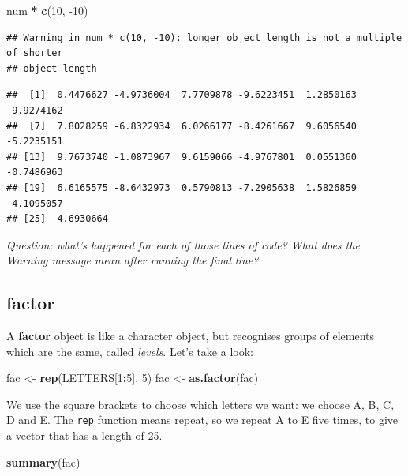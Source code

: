 \documentclass[
]{book}
\newenvironment{Shaded}{\begin{snugshade}}{\end{snugshade}}
\newcommand{\DecValTok}[1]{\textcolor[rgb]{0.00,0.00,0.81}{#1}}
\newcommand{\KeywordTok}[1]{\textcolor[rgb]{0.13,0.29,0.53}{\textbf{#1}}}
\newcommand{\NormalTok}[1]{#1}
\newcommand{\OperatorTok}[1]{\textcolor[rgb]{0.81,0.36,0.00}{\textbf{#1}}}
\newcommand{\StringTok}[1]{\textcolor[rgb]{0.31,0.60,0.02}{#1}}
\begin{document}
\begin{Shaded}
\begin{Highlighting}[]
\NormalTok{num }\OperatorTok{*}\StringTok{ }\KeywordTok{c}\NormalTok{(}\DecValTok{10}\NormalTok{, }\DecValTok{-10}\NormalTok{)}
\end{Highlighting}
\end{Shaded}

\begin{verbatim}
## Warning in num * c(10, -10): longer object length is not a multiple of shorter
## object length
\end{verbatim}

\begin{verbatim}
##  [1]  0.4476627 -4.9736004  7.7709878 -9.6223451  1.2850163 -9.9274162
##  [7]  7.8028259 -6.8322934  6.0266177 -8.4261667  9.6056540 -5.2235151
## [13]  9.7673740 -1.0873967  9.6159066 -4.9767801  0.0551360 -0.7486963
## [19]  6.6165575 -8.6432973  0.5790813 -7.2905638  1.5826859 -4.1095057
## [25]  4.6930664
\end{verbatim}

\emph{Question: what's happened for each of those lines of code? What does the Warning
message mean after running the final line?}\\
\hspace*{0.333em}

\hypertarget{factor}{%
\subsection{factor}\label{factor}}

A \textbf{factor} object is like a character object, but recognises groups of elements
which are the same, called \emph{levels}. Let's take a look:

\begin{Shaded}
\begin{Highlighting}[]
\NormalTok{fac <-}\StringTok{ }\KeywordTok{rep}\NormalTok{(LETTERS[}\DecValTok{1}\OperatorTok{:}\DecValTok{5}\NormalTok{], }\DecValTok{5}\NormalTok{)}
\NormalTok{fac <-}\StringTok{ }\KeywordTok{as.factor}\NormalTok{(fac)}
\end{Highlighting}
\end{Shaded}

We use the square brackets to choose which letters we
want: we choose A, B, C, D and E. The \texttt{rep} function means repeat, so we
repeat A to E five times, to give a vector that has a length of 25.

\begin{Shaded}
\begin{Highlighting}[]
\KeywordTok{summary}\NormalTok{(fac)}
\end{Highlighting}
\end{Shaded}
\end{document}
